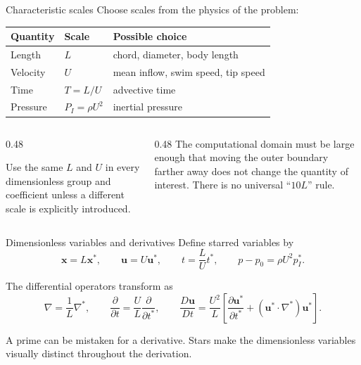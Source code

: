 \documentclass[aspectratio=169,11pt]{beamer}
\newcommand{\uvec}{\bm{u}}
\newcommand{\xvec}{\bm{x}}
\begin{document}
\begin{frame}{Characteristic scales}
Choose scales from the physics of the problem:
\begin{center}
\renewcommand{\arraystretch}{1.18}
\begin{tabular}{lll}
\toprule
Quantity & Scale & Possible choice \\
\midrule
Length & $L$ & chord, diameter, body length \\
Velocity & $U$ & mean inflow, swim speed, tip speed \\
Time & $T=L/U$ & advective time \\
Pressure & $P_I=\rho U^2$ & inertial pressure \\
\bottomrule
\end{tabular}
\end{center}
\medskip
\begin{columns}[T,onlytextwidth]
\begin{column}{0.48\textwidth}
\begin{punchbox}
\small
Use the same $L$ and $U$ in every dimensionless group and coefficient unless a different scale is explicitly introduced.
\end{punchbox}
\end{column}
\begin{column}{0.48\textwidth}
\small
The computational domain must be large enough that moving the outer boundary farther away does not change the quantity of interest. There is no universal ``$10L$'' rule.
\end{column}
\end{columns}
\end{frame}

\begin{frame}{Dimensionless variables and derivatives}
Define starred variables by
\[
  \xvec=L\xvec^*,
  \qquad
  \uvec=U\uvec^*,
  \qquad
  t=\frac{L}{U}t^*,
  \qquad
  p-p_0=\rho U^2 p_I^*.
\]

The differential operators transform as
\[
  \nabla=\frac{1}{L}\nabla^*,
  \qquad
  \frac{\partial}{\partial t}=\frac{U}{L}\frac{\partial}{\partial t^*},
  \qquad
  \frac{D\uvec}{Dt}=\frac{U^2}{L}
  \left[
  \frac{\partial\uvec^*}{\partial t^*}
  +(\uvec^*\!\cdot\!\nabla^*)\uvec^*
  \right].
\]

\begin{punchbox}
\small A prime can be mistaken for a derivative. Stars make the dimensionless variables visually distinct throughout the derivation.
\end{punchbox}
\end{frame}
\end{document}
